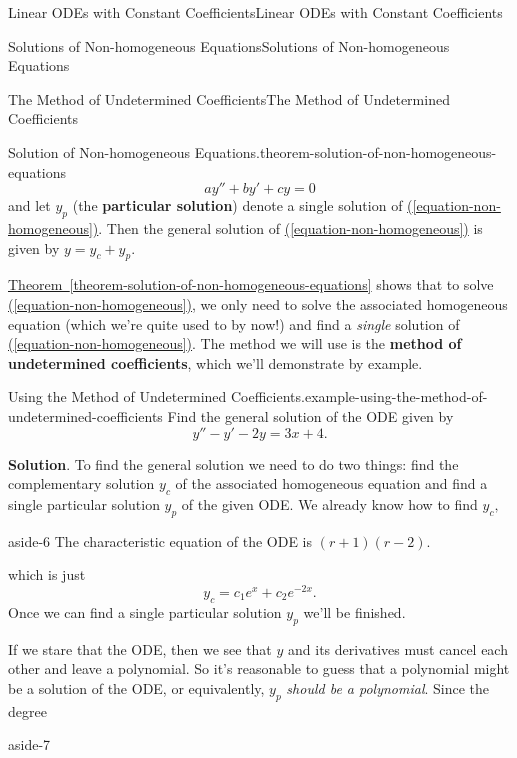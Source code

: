 \documentclass[10pt,]{book}
\newcommand{\terminology}[1]{\textbf{#1}}
\numberwithin{equation}{section}
\begin{document}
\begin{chapterptx}{Linear ODEs with Constant Coefficients}{}{Linear ODEs with Constant Coefficients}{}{}
\begin{sectionptx}{Solutions of Non-homogeneous Equations}{}{Solutions of Non-homogeneous Equations}{}{}
\begin{subsectionptx}{The Method of Undetermined Coefficients}{}{The Method of Undetermined Coefficients}{}{}
\begin{theorem}{Solution of Non-homogeneous Equations.}{}{theorem-solution-of-non-homogeneous-equations}
\begin{equation*}
ay'' + by' + cy = 0
\end{equation*}
and let \(y_{p}\) (the \terminology{particular solution}) denote a single solution of \hyperref[equation-non-homogeneous]{(\ref{equation-non-homogeneous})}. Then the general solution of \hyperref[equation-non-homogeneous]{(\ref{equation-non-homogeneous})} is given by \(y = y_{c} + y_{p}\).%
\end{theorem}
\hypertarget{p-226}{}%
\hyperref[theorem-solution-of-non-homogeneous-equations]{Theorem~\ref{theorem-solution-of-non-homogeneous-equations}} shows that to solve \hyperref[equation-non-homogeneous]{(\ref{equation-non-homogeneous})}, we only need to solve the associated homogeneous equation (which we're quite used to by now!) and find a \emph{single} solution of \hyperref[equation-non-homogeneous]{(\ref{equation-non-homogeneous})}. The method we will use is the \terminology{method of undetermined coefficients}, which we'll demonstrate by example.%
\begin{example}{Using the Method of Undetermined Coefficients.}{example-using-the-method-of-undetermined-coefficients}%
\hypertarget{p-227}{}%
Find the general solution of the ODE given by%
\begin{equation*}
y'' - y' - 2y = 3x + 4.
\end{equation*}
%
\par\smallskip%
\noindent\textbf{Solution}.\hypertarget{solution-32}{}\quad%
\hypertarget{p-228}{}%
To find the general solution we need to do two things: find the complementary solution \(y_{c}\) of the associated homogeneous equation and find a single particular solution \(y_{p}\) of the given ODE. We already know how to find \(y_{c},\)\begin{aside}{}{aside-6}%
\hypertarget{p-229}{}%
The characteristic equation of the ODE is \((r + 1)(r - 2)\).%
\end{aside}
 which is just%
\begin{equation*}
y_{c} = c_{1}e^{x} + c_{2}e^{-2x}.
\end{equation*}
Once we can find a single particular solution \(y_{p}\) we'll be finished.%
\par
\hypertarget{p-230}{}%
If we stare that the ODE, then we see that \(y\) and its derivatives must cancel each other and leave a polynomial. So it's reasonable to guess that a polynomial might be a solution of the ODE, or equivalently, \(y_{p}\) \emph{should be a polynomial}. Since the degree\begin{aside}{}{aside-7}%

\end{aside}
\end{example}
\end{subsectionptx}
\end{sectionptx}
\end{chapterptx}
\end{document}
